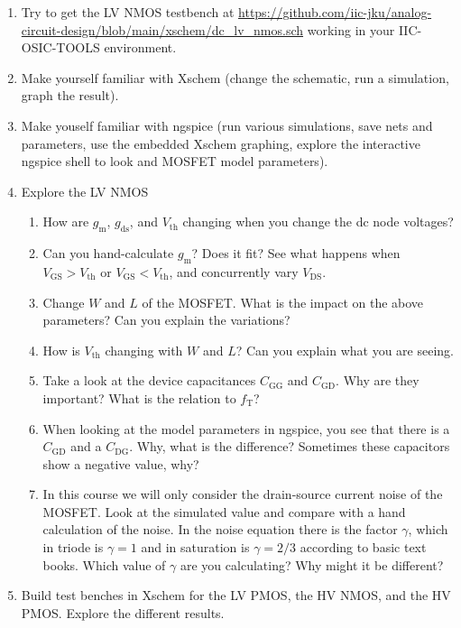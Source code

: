 \documentclass[
  a4paper,
  DIV=11,
  numbers=noendperiod]{scrartcl}
\providecommand{\tightlist}{%
  \setlength{\itemsep}{0pt}\setlength{\parskip}{0pt}}\usepackage{longtable,booktabs,array}
\begin{document}
\begin{enumerate}
\def\labelenumi{\arabic{enumi}.}
\tightlist
\item
  Try to get the LV NMOS testbench at
  \url{https://github.com/iic-jku/analog-circuit-design/blob/main/xschem/dc_lv_nmos.sch}
  working in your IIC-OSIC-TOOLS environment.
\item
  Make yourself familiar with Xschem (change the schematic, run a
  simulation, graph the result).
\item
  Make youself familiar with ngspice (run various simulations, save nets
  and parameters, use the embedded Xschem graphing, explore the
  interactive ngspice shell to look and MOSFET model parameters).
\item
  Explore the LV NMOS

  \begin{enumerate}
  \def\labelenumii{\arabic{enumii}.}
  \tightlist
  \item
    How are \(g_\mathrm{m}\), \(g_\mathrm{ds}\), and \(V_\mathrm{th}\)
    changing when you change the dc node voltages?
  \item
    Can you hand-calculate \(g_\mathrm{m}\)? Does it fit? See what
    happens when \(V_\mathrm{GS} > V_\mathrm{th}\) or
    \(V_\mathrm{GS} < V_\mathrm{th}\), and concurrently vary
    \(V_\mathrm{DS}\).
  \item
    Change \(W\) and \(L\) of the MOSFET. What is the impact on the
    above parameters? Can you explain the variations?
  \item
    How is \(V_\mathrm{th}\) changing with \(W\) and \(L\)? Can you
    explain what you are seeing.
  \item
    Take a look at the device capacitances \(C_\mathrm{GG}\) and
    \(C_\mathrm{GD}\). Why are they important? What is the relation to
    \(f_\mathrm{T}\)?
  \item
    When looking at the model parameters in ngspice, you see that there
    is a \(C_\mathrm{GD}\) and a \(C_\mathrm{DG}\). Why, what is the
    difference? Sometimes these capacitors show a negative value, why?
  \item
    In this course we will only consider the drain-source current noise
    of the MOSFET. Look at the simulated value and compare with a hand
    calculation of the noise. In the noise equation there is the factor
    \(\gamma\), which in triode is \(\gamma=1\) and in saturation is
    \(\gamma=2/3\) according to basic text books. Which value of
    \(\gamma\) are you calculating? Why might it be different?
  \end{enumerate}
\item
  Build test benches in Xschem for the LV PMOS, the HV NMOS, and the HV
  PMOS. Explore the different results.


\end{enumerate}
\end{document}
